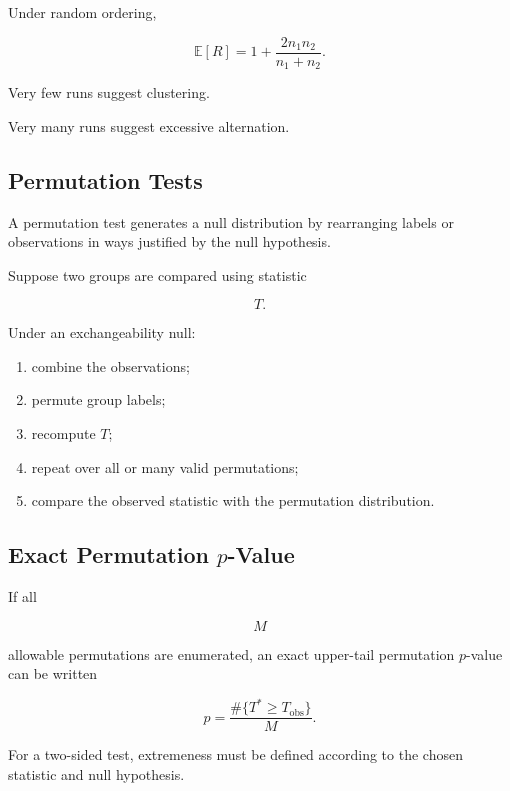 Under random ordering,

\[
\boxed{
\mathbb{E}[R]
=
1+
\frac{
2n_1n_2
}{
n_1+n_2
}.
}
\]

Very few runs suggest clustering.

Very many runs suggest excessive alternation.

\subsection{Permutation Tests}
\label{subsec:permutation-tests-nonparametric}

A permutation test generates a null distribution by rearranging labels
or observations in ways justified by the null hypothesis.

Suppose two groups are compared using statistic

\[
T.
\]

Under an exchangeability null:

\begin{enumerate}
    \item combine the observations;
    \item permute group labels;
    \item recompute \(T\);
    \item repeat over all or many valid permutations;
    \item compare the observed statistic with the permutation
          distribution.
\end{enumerate}

\subsection{Exact Permutation \(p\)-Value}
\label{subsec:exact-permutation-p-value}

If all

\[
M
\]

allowable permutations are enumerated, an exact upper-tail permutation
\(p\)-value can be written

\[
\boxed{
p
=
\frac{
\#\{
T^*\geq T_{\text{obs}}
\}
}{
M
}.
}
\]

For a two-sided test, extremeness must be defined according to the chosen
statistic and null hypothesis.

